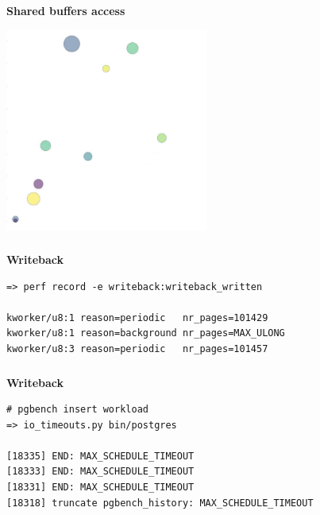 \documentclass[usenames,dvipsnames, 18pt, compress, aspectratio=169]{beamer}
\begin{document}

\begin{frame}[fragile]{}
    \frametitle{}
    \begin{center}
        \textbf{Writeback}

        \begin{flushleft}
		\begin{verbatim}
=> perf record -e writeback:writeback_written

kworker/u8:1 reason=periodic   nr_pages=101429
kworker/u8:1 reason=background nr_pages=MAX_ULONG
kworker/u8:3 reason=periodic   nr_pages=101457
        \end{verbatim}
        \end{flushleft}

    \end{center}
\end{frame}

\begin{frame}[fragile]{}
    \frametitle{}
    \begin{center}
        \textbf{Writeback}

        \begin{flushleft}
		\begin{verbatim}
# pgbench insert workload
=> io_timeouts.py bin/postgres

[18335] END: MAX_SCHEDULE_TIMEOUT
[18333] END: MAX_SCHEDULE_TIMEOUT
[18331] END: MAX_SCHEDULE_TIMEOUT
[18318] truncate pgbench_history: MAX_SCHEDULE_TIMEOUT
        \end{verbatim}
        \end{flushleft}

    \end{center}
\end{frame}
\end{document}
